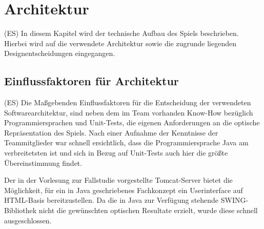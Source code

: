 \clearpage
\chapter{Architektur}
(ES) In diesem Kapitel wird der technische Aufbau des Spiels beschrieben. Hierbei wird auf die verwendete Architektur sowie die zugrunde liegenden Designentscheidungen eingegangen.

\section{Einflussfaktoren für Architektur}
(ES) Die Maßgebenden Einflussfaktoren für die Entscheidung der verwendeten Softwarearchitektur, sind neben dem im Team vorhanden Know-How bezüglich Programmiersprachen und Unit-Tests, die eigenen Anforderungen an die optische Repräsentation des Spiels. Nach einer Aufnahme der Kenntnisse der Teammitglieder war schnell ersichtlich, dass die Programmiersprache Java am verbreitetsten ist und sich in Bezug auf Unit-Tests auch hier die größte Übereinstimmung findet.

Der in der Vorlesung zur Fallstudie vorgestellte Tomcat-Server bietet die Möglichkeit, für ein in Java geschriebenes Fachkonzept ein Userinterface auf HTML-Basis bereitzustellen. Da die in Java zur Verfügung stehende SWING-Bibliothek nicht die gewünschten optischen Resultate erzielt, wurde diese schnell ausgeschlossen.

